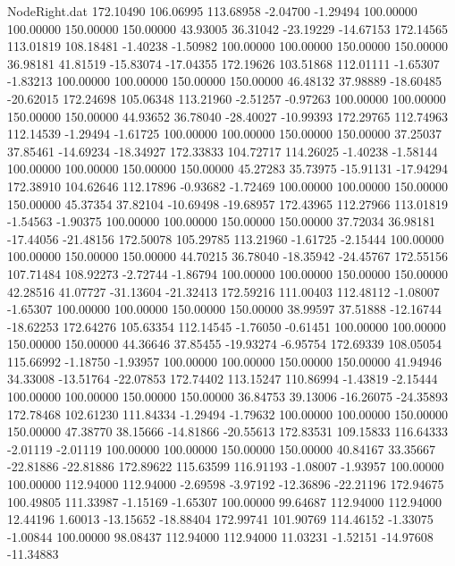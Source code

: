 \begin{filecontents}{NodeRight.dat}
 172.10490  106.06995  113.68958    -2.04700   -1.29494  100.00000  100.00000  150.00000  150.00000   43.93005   36.31042  -23.19229  -14.67153
 172.14565  113.01819  108.18481    -1.40238   -1.50982  100.00000  100.00000  150.00000  150.00000   36.98181   41.81519  -15.83074  -17.04355
 172.19626  103.51868  112.01111    -1.65307   -1.83213  100.00000  100.00000  150.00000  150.00000   46.48132   37.98889  -18.60485  -20.62015
 172.24698  105.06348  113.21960    -2.51257   -0.97263  100.00000  100.00000  150.00000  150.00000   44.93652   36.78040  -28.40027  -10.99393
 172.29765  112.74963  112.14539    -1.29494   -1.61725  100.00000  100.00000  150.00000  150.00000   37.25037   37.85461  -14.69234  -18.34927
 172.33833  104.72717  114.26025    -1.40238   -1.58144  100.00000  100.00000  150.00000  150.00000   45.27283   35.73975  -15.91131  -17.94294
 172.38910  104.62646  112.17896    -0.93682   -1.72469  100.00000  100.00000  150.00000  150.00000   45.37354   37.82104  -10.69498  -19.68957
 172.43965  112.27966  113.01819    -1.54563   -1.90375  100.00000  100.00000  150.00000  150.00000   37.72034   36.98181  -17.44056  -21.48156
 172.50078  105.29785  113.21960    -1.61725   -2.15444  100.00000  100.00000  150.00000  150.00000   44.70215   36.78040  -18.35942  -24.45767
 172.55156  107.71484  108.92273    -2.72744   -1.86794  100.00000  100.00000  150.00000  150.00000   42.28516   41.07727  -31.13604  -21.32413
 172.59216  111.00403  112.48112    -1.08007   -1.65307  100.00000  100.00000  150.00000  150.00000   38.99597   37.51888  -12.16744  -18.62253
 172.64276  105.63354  112.14545    -1.76050   -0.61451  100.00000  100.00000  150.00000  150.00000   44.36646   37.85455  -19.93274   -6.95754
 172.69339  108.05054  115.66992    -1.18750   -1.93957  100.00000  100.00000  150.00000  150.00000   41.94946   34.33008  -13.51764  -22.07853
 172.74402  113.15247  110.86994    -1.43819   -2.15444  100.00000  100.00000  150.00000  150.00000   36.84753   39.13006  -16.26075  -24.35893
 172.78468  102.61230  111.84334    -1.29494   -1.79632  100.00000  100.00000  150.00000  150.00000   47.38770   38.15666  -14.81866  -20.55613
 172.83531  109.15833  116.64333    -2.01119   -2.01119  100.00000  100.00000  150.00000  150.00000   40.84167   33.35667  -22.81886  -22.81886
 172.89622  115.63599  116.91193    -1.08007   -1.93957  100.00000  100.00000  112.94000  112.94000   -2.69598   -3.97192  -12.36896  -22.21196
 172.94675  100.49805  111.33987    -1.15169   -1.65307  100.00000   99.64687  112.94000  112.94000   12.44196    1.60013  -13.15652  -18.88404
 172.99741  101.90769  114.46152    -1.33075   -1.00844  100.00000   98.08437  112.94000  112.94000   11.03231   -1.52151  -14.97608  -11.34883

\end{filecontents}
